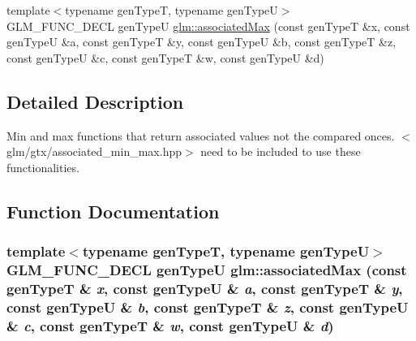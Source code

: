 \begin{CompactItemize}
\item 
{\footnotesize template$<$typename genTypeT, typename genTypeU$>$ }\\GLM\_\-FUNC\_\-DECL genTypeU \hyperlink{group__gtx__associated__min__max_gf686e1b579e8518dcba6dd682e743955}{glm::associatedMax} (const genTypeT \&x, const genTypeU \&a, const genTypeT \&y, const genTypeU \&b, const genTypeT \&z, const genTypeU \&c, const genTypeT \&w, const genTypeU \&d)
\end{CompactItemize}


\subsection{Detailed Description}
Min and max functions that return associated values not the compared onces. $<$glm/gtx/associated\_\-min\_\-max.hpp$>$ need to be included to use these functionalities. 



\subsection{Function Documentation}
\hypertarget{group__gtx__associated__min__max_gf686e1b579e8518dcba6dd682e743955}{
\subsubsection[associatedMax]{\setlength{\rightskip}{0pt plus 5cm}template$<$typename genTypeT, typename genTypeU$>$ GLM\_\-FUNC\_\-DECL genTypeU glm::associatedMax (const genTypeT \& {\em x}, \/  const genTypeU \& {\em a}, \/  const genTypeT \& {\em y}, \/  const genTypeU \& {\em b}, \/  const genTypeT \& {\em z}, \/  const genTypeU \& {\em c}, \/  const genTypeT \& {\em w}, \/  const genTypeU \& {\em d})}}
\label{group__gtx__associated__min__max_gf686e1b579e8518dcba6dd682e743955}


